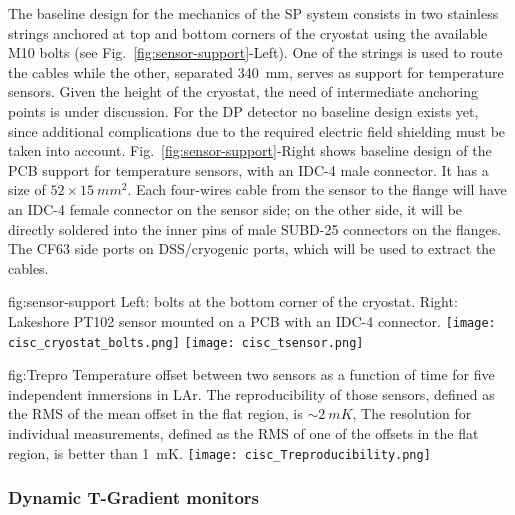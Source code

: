 The baseline design for the mechanics of the SP system consists in two stainless strings anchored at top and bottom corners of the cryostat
using the available M10 bolts (see Fig.~\ref{fig:sensor-support}-Left). One of the strings is used to route the cables while the other,
separated \SI{340}{mm}, serves as support for temperature sensors.
Given the height of the cryostat, the need of intermediate anchoring points is under discussion. For the DP detector no baseline design exists yet,
since additional complications due to the required electric field shielding must be taken into account. Fig.~\ref{fig:sensor-support}-Right shows baseline design of the
PCB support for temperature sensors, with an IDC-4 male connector. It has a size of $52\times \SI{15}{mm^2}$. Each four-wires cable from the sensor to the flange will have an IDC-4 female connector
on the sensor side; on the other side, it will be directly soldered into the inner pins of male SUBD-25 connectors on the flanges. The CF63 side ports on DSS/cryogenic ports,
which will be used to extract the cables. 

\begin{dunefigure}{fig:sensor-support}
  {Left: bolts at the bottom corner of the cryostat. Right: Lakeshore PT102 sensor mounted on a PCB with an IDC-4 connector.}
  \texttt{[image: cisc\_cryostat\_bolts.png]}%
    \hspace{1cm}%
  \texttt{[image: cisc\_tsensor.png]}%
\end{dunefigure}


\begin{dunefigure}{fig:Trepro}
  {Temperature offset between two sensors as a function of time for five independent inmersions in LAr. The reproducibility of those sensors,
    defined as the RMS of the mean offset in the flat region, is $\sim \SI{2}{mK}$,
    The resolution for individual measurements, defined as the RMS of one of the offsets in the flat region, is better than \SI{1}{mK}.}
  \texttt{[image: cisc\_Treproducibility.png]}%
\end{dunefigure}


\subsubsection{Dynamic T-Gradient monitors}

